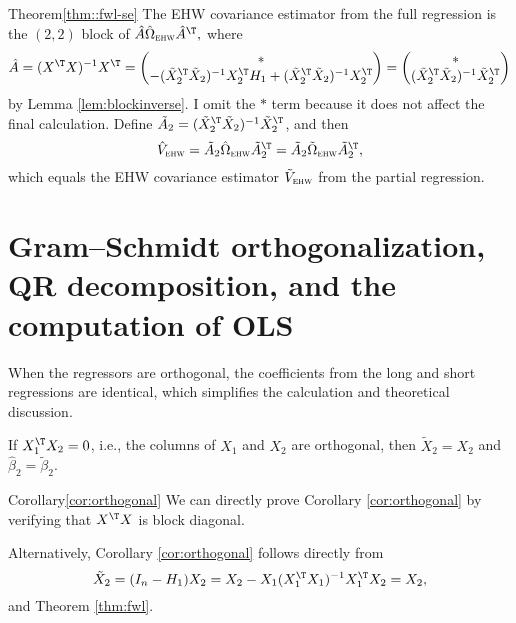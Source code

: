 \begin{myproof}{Theorem}{\ref{thm::fwl-se}}
The EHW covariance estimator from the full regression is the $(2,2)$ block of
$
 \hat{A}\hat{\Omega}_\textsc{ehw} \hat{A}^{\T},
$
where  
$$
\hat{A} = (X ^{\T} X)^{-1} X ^{\T} = \begin{pmatrix}
*\\
 -  ( \tilde{X}_2 ^{\T} \tilde{X}_2 )^{-1} X_2 ^{\T} H_1 + ( \tilde{X}_2 ^{\T}  \tilde{X}_2 )^{-1}X_2 ^{\T}
\end{pmatrix}
=\begin{pmatrix}
*\\
 ( \tilde{X}_2 ^{\T} \tilde{X}_2 )^{-1}\tilde{X}_2 ^{\T}
\end{pmatrix}
$$
by Lemma \ref{lem:blockinverse}. I omit the  $*$ term because it does not affect the final calculation.
Define $\tilde{A}_2 =   ( \tilde{X}_2 ^{\T} \tilde{X}_2 )^{-1}\tilde{X}_2^{\T}$, and then
$$
\hat{V}_{\textsc{ehw}} 
= \tilde{A}_2 \hat{\Omega}_\textsc{ehw} \tilde{A}_2^{\T}
=  \tilde{A}_2 \tilde{\Omega}_\textsc{ehw}  \tilde{A}_2 ^{\T},
$$
which equals the EHW covariance estimator $\tilde{V}_{\textsc{ehw}}$ from the partial regression. 
\end{myproof}




\section{Gram--Schmidt orthogonalization, QR decomposition, and the computation of OLS}



 When the regressors are orthogonal, the coefficients from the long and short regressions are identical, which simplifies the calculation and theoretical discussion. 

\begin{corollary}
\label{cor:orthogonal}If $X_{1}^{\T}X_{2}=0$, i.e., the columns
of $X_{1}$ and $X_{2}$ are orthogonal, then $\tilde{X}_{2}=X_{2}$
and $\hat{\beta}_{2}=\tilde{\beta}_{2}.$ 
\end{corollary}


\begin{myproof}{Corollary}{\ref{cor:orthogonal}}
We can directly prove Corollary \ref{cor:orthogonal} by verifying that $X^{\T} X$ is block diagonal. 

Alternatively, 
Corollary \ref{cor:orthogonal} follows directly from
\[
\tilde{X}_{2}=(I_{n}-H_{1})X_{2}=X_{2}-X_{1}(X_{1}^{\T}X_{1})^{-1}X_{1}^{\T}X_{2}=X_{2},
\]
 and Theorem \ref{thm:fwl}.
\end{myproof}
 

